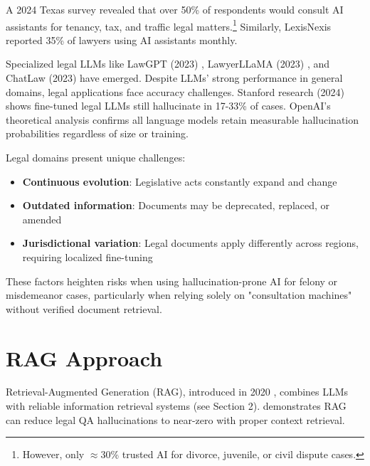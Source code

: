 A 2024 Texas survey \cite{seabrookeSurveyLayPeoples2024} revealed that over 50\% of respondents would consult AI assistants for tenancy, tax, and traffic legal matters.\footnote{
    However, only $\approx$30\% trusted AI for divorce, juvenile, or civil dispute cases.
} Similarly, LexisNexis \cite{LawyersGearGenerative} reported 35\% of lawyers using AI assistants monthly.

Specialized legal LLMs like LawGPT (2023) \cite{nguyenBriefReportLawGPT2023}, LawyerLLaMA (2023) \cite{huangLawyerLLaMATechnical2023}, and ChatLaw (2023) \cite{cuiChatlawMultiAgentCollaborative2024a} have emerged. Despite LLMs' strong performance in general domains, legal applications face accuracy challenges. Stanford research (2024) \cite{mageshHallucinationFreeAssessingReliability2024a} shows fine-tuned legal LLMs still hallucinate in 17-33\% of cases. OpenAI's theoretical analysis \cite{kalaiCalibratedLanguageModels2024} confirms all language models retain measurable hallucination probabilities regardless of size or training.

Legal domains present unique challenges:
\begin{itemize}
    \item \textbf{Continuous evolution}: Legislative acts constantly expand and change
    \item \textbf{Outdated information}: Documents may be deprecated, replaced, or amended
    \item \textbf{Jurisdictional variation}: Legal documents apply differently across regions, requiring localized fine-tuning
\end{itemize}

These factors heighten risks when using hallucination-prone AI for felony or misdemeanor cases, particularly when relying solely on "consultation machines" without verified document retrieval.

\section{RAG Approach}
Retrieval-Augmented Generation (RAG), introduced in 2020 \cite{lewisRetrievalAugmentedGenerationKnowledgeIntensive2020}, combines LLMs with reliable information retrieval systems (see Section 2). \cite{mageshHallucinationFreeAssessingReliability2024a} demonstrates RAG can reduce legal QA hallucinations to near-zero with proper context retrieval.

